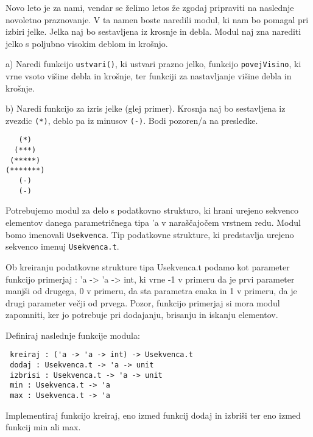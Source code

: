 \begin{ex}
Novo leto je za nami, vendar se \v zelimo letos \v ze zgodaj pripraviti na
naslednje novoletno praznovanje. V ta namen boste naredili modul, ki
nam bo pomagal pri izbiri jelke. Jelka naj bo sestavljena iz krosnje
in debla. Modul naj zna narediti jelko s poljubno visokim deblom in
kro\v snjo.

a) Naredi funkcijo \lstinline{ustvari()}, ki ustvari prazno jelko, funkcijo
\lstinline{povejVisino}, ki vrne vsoto vi\v sine debla in kro\v snje, ter funkciji za
nastavljanje vi\v sine debla in kro\v snje.

b) Naredi funkcijo za izris jelke (glej primer). Krosnja naj bo
sestavljena iz zvezdic \lstinline{(*)}, deblo pa iz minusov \lstinline{(-)}. Bodi pozoren/a
na presledke.
\begin{lstlisting}
   (*)
  (***)
 (*****)
(*******)
   (-)
   (-)
\end{lstlisting}
\end{ex}



\begin{ex}
Potrebujemo modul za delo s podatkovno strukturo, ki hrani urejeno sekvenco elementov danega parametri\v cnega tipa 'a v nara\v s\v cajo\v cem vrstnem redu. Modul bomo imenovali \lstinline{Usekvenca}. Tip podatkovne strukture, ki predstavlja urejeno sekvenco imenuj \lstinline{Usekvenca.t}.

Ob kreiranju podatkovne strukture tipa Usekvenca.t podamo kot parameter funkcijo primerjaj : 'a -> 'a -> int, ki vrne -1 v primeru da je prvi parameter manj\v si od drugega, 0 v primeru, da sta parametra enaka in 1 v primeru, da je drugi parameter ve\v cji od prvega. Pozor, funkcijo primerjaj si mora modul zapomniti, ker jo potrebuje pri
dodajanju, brisanju in iskanju elementov.

Definiraj naslednje funkcije modula: 
\begin{lstlisting}
 kreiraj : ('a -> 'a -> int) -> Usekvenca.t 
 dodaj : Usekvenca.t -> 'a -> unit 
 izbrisi : Usekvenca.t -> 'a -> unit   
 min : Usekvenca.t -> 'a 
 max : Usekvenca.t -> 'a 
\end{lstlisting}

Implementiraj funkcijo kreiraj, eno izmed funkcij dodaj in izbri\v si ter
eno izmed funkcij min ali max.
\end{ex}



